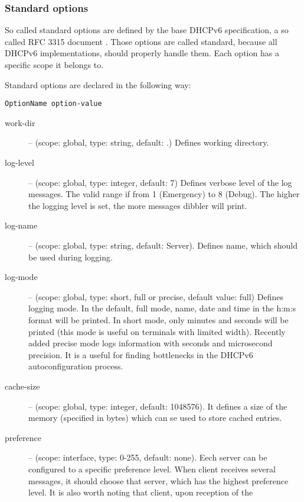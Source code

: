\subsubsection{Standard options}

So called standard options are defined by the base DHCPv6 specification,
a so called RFC 3315 document \cite{rfc3315}. Those options are
called standard, because all DHCPv6 implementations, should properly
handle them. Each option has a specific scope it belongs to. 

Standard options are declared in the following way:

\begin{verbatim}
OptionName option-value
\end{verbatim}

\begin{description}
 \item[work-dir] -- (scope: global, type: string, default: .) Defines working
	    directory.
 \item[log-level] -- (scope: global, type: integer, default: 7) Defines
	    verbose level of the log messages. The valid range if
	    from 1 (Emergency) to 8 (Debug). The higher the logging
	    level is set, the more messages dibbler will print.
 \item[log-name] -- (scope: global, type: string, default: Server). Defines 
	    name, which should be used during logging.
 \item[log-mode] -- (scope: global, type: short, full or precise,
	    default value: full) Defines logging mode. In the
	    default, full mode, name, date and time in the h:m:s format
	    will be printed. In short mode, only minutes and
	    seconds will be printed (this mode is useful on
	    terminals with limited width). Recently added precise
	    mode logs information with seconds and microsecond
	    precision. It is a useful for finding bottlenecks in
	    the DHCPv6 autoconfiguration process.
 \item[cache-size] -- (scope: global, type: integer, default:
	    1048576). It defines a size of the memory (specified in
            bytes) which can se used to store cached entries.
 \item[preference] -- (scope: interface, type: 0-255, default:
	    none). Eech server can be configured to a specific
	    preference level. When client receives several
	     messages, it should choose that server,
	    which has the highest preference level. It is also worth
	    noting that client, upon reception of the 

\end{description}
